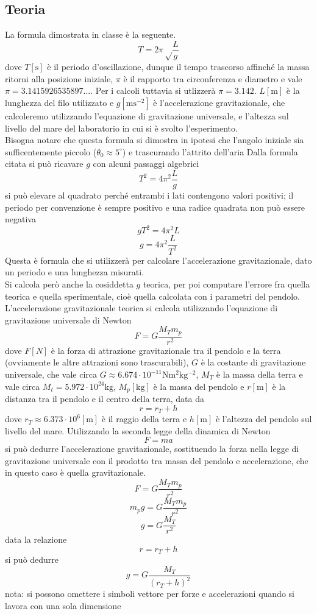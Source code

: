 \documentclass{article}
\begin{document}
\subsection{Teoria}
La formula dimostrata in classe è la seguente.
$$T = 2\pi\sqrt\frac{L}{g}$$
dove $T [\mathrm{s}]$ è il periodo d'oscillazione, dunque il tempo trascorso affinché la massa ritorni alla posizione iniziale, $\pi$ è il rapporto tra circonferenza e diametro e vale $\pi = 3.1415926535897...$. Per i calcoli tuttavia si utlizzerà $\pi = 3.142$. $L [\mathrm{m}]$ è la lunghezza del filo utilizzato e $g [\mathrm{m s^{-2}}]$ è l'accelerazione gravitazionale, che calcoleremo utilizzando l'equazione di gravitazione universale, e l'altezza sul livello del mare del laboratorio in cui si è svolto l'esperimento. \\
Bisogna notare che questa formula si dimostra in ipotesi che l'angolo iniziale sia sufficentemente piccolo ($\theta_0 \approx 5^{\circ}$) e trascurando l'attrito dell'aria
Dalla formula citata si può ricavare $g$ con alcuni passaggi algebrici
$$T^2 = 4\pi^2\frac{L}{g}$$
si può elevare al quadrato perché entrambi i lati contengono valori positivi; il periodo per convenzione è sempre positivo e una radice quadrata non può essere negativa
$$g T^2 = 4\pi^2 L$$
$$g = 4\pi^2\frac{L}{T^2}$$
Questa è formula che si utilizzerà per calcolare l'accelerazione gravitazionale, dato un periodo e una lunghezza misurati. \\
Si calcola però anche la cosiddetta $g$ teorica, per poi computare l'errore fra quella teorica e quella sperimentale, cioè quella calcolata con i parametri del pendolo. \\
L'accelerazione gravitazionale teorica si calcola utilizzando l'equazione di gravitazione universale di Newton
$$F = G\frac{M_T m_p}{r^2}$$
dove $F [N]$ è la forza di attrazione gravitazionale tra il pendolo e la terra (ovviamente le altre attrazioni sono trascurabili), $G$ è la costante di gravitazione universale, che vale circa $G \approx 6.674 \cdot 10^{-11}\mathrm{N m^2 kg ^ {-2}}$, $M_T$ è la massa della terra e vale circa $M_t = 5.972 \cdot 10^{24}\mathrm{kg}$, $M_p [\mathrm{kg}]$ è la massa del pendolo e $r [\mathrm{m}]$ è la distanza tra il pendolo e il centro della terra, data da
$$r = r_T + h$$
dove $r_T \approx 6.373 \cdot 10^6[\mathrm{m}]$ è il raggio della terra e $h [\mathrm{m}]$ è l'altezza del pendolo sul livello del mare.
Utilizzando la seconda legge della dinamica di Newton $$F = ma$$ si può dedurre l'accelerazione gravitazionale, sostituendo la forza nella legge di gravitazione universale con il prodotto tra massa del pendolo e accelerazione, che in questo caso è quella gravitazionale.
$$F = G\frac{M_T m_p}{r^2}$$
$$m_pg = G\frac{M_T m_p}{r^2}$$
$$g = G\frac{M_T}{r^2}$$
data la relazione
$$r = r_T + h$$
si può dedurre
$$g = G\frac{M_T}{(r_T + h)^2}$$
nota: si possono omettere i simboli vettore per forze e accelerazioni quando si lavora con una sola dimensione
\end{document}
